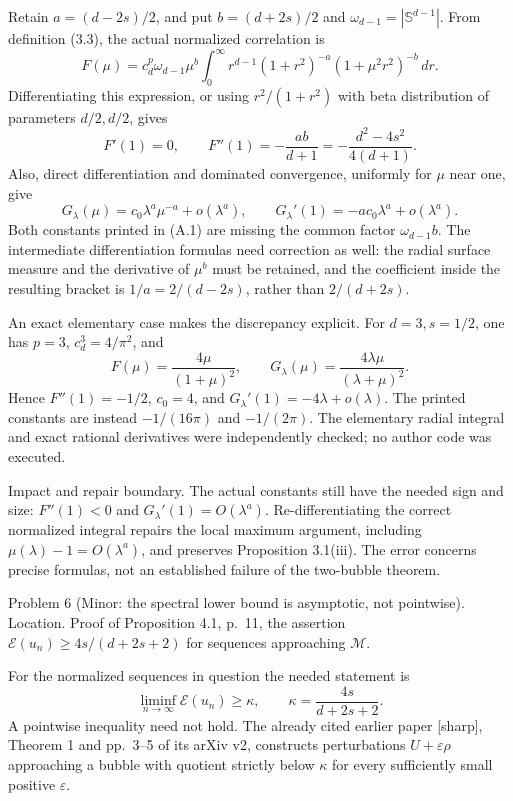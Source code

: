 \documentclass[10pt]{article}
\begin{document}
Retain \(a=(d-2s)/2\), and put \(b=(d+2s)/2\) and \(\omega_{d-1}=|\mathbb S^{d-1}|\). From definition (3.3), the actual normalized correlation is \[F(\mu)=c_d^p\omega_{d-1}\mu^b
 \int_0^\infty r^{d-1}(1+r^2)^{-a}(1+\mu^2r^2)^{-b}\,dr.\] Differentiating this expression, or using \(r^2/(1+r^2)\) with beta distribution of parameters \(d/2,d/2\), gives \[F'(1)=0,\qquad
 F''(1)=-\frac{ab}{d+1}
       =-\frac{d^2-4s^2}{4(d+1)}.\] Also, direct differentiation and dominated convergence, uniformly for \(\mu\) near one, give \[G_\lambda(\mu)=c_0\lambda^a\mu^{-a}+o(\lambda^a),
 \qquad G_\lambda'(1)=-a c_0\lambda^a+o(\lambda^a).\] Both constants printed in (A.1) are missing the common factor \(\omega_{d-1}b\). The intermediate differentiation formulas need correction as well: the radial surface measure and the derivative of \(\mu^b\) must be retained, and the coefficient inside the resulting bracket is \(1/a=2/(d-2s)\), rather than \(2/(d+2s)\).\par
An exact elementary case makes the discrepancy explicit. For \(d=3,s=1/2\), one has \(p=3\), \(c_d^3=4/\pi^2\), and \[F(\mu)=\frac{4\mu}{(1+\mu)^2},\qquad
 G_\lambda(\mu)=\frac{4\lambda\mu}{(\lambda+\mu)^2}.\] Hence \(F''(1)=-1/2\), \(c_0=4\), and \(G_\lambda'(1)=-4\lambda+o(\lambda)\). The printed constants are instead \(-1/(16\pi)\) and \(-1/(2\pi)\). The elementary radial integral and exact rational derivatives were independently checked; no author code was executed.\par
Impact and repair boundary. The actual constants still have the needed sign and size: \(F''(1)<0\) and \(G_\lambda'(1)=O(\lambda^a)\). Re-differentiating the correct normalized integral repairs the local maximum argument, including \(\mu(\lambda)-1=O(\lambda^a)\), and preserves Proposition 3.1(iii). The error concerns precise formulas, not an established failure of the two-bubble theorem.\par
Problem 6 (Minor: the spectral lower bound is asymptotic, not pointwise).  Location. Proof of Proposition 4.1, p. 11, the assertion \(\mathcal E(u_n)\ge4s/(d+2s+2)\) for sequences approaching \(\mathcal M\).\par
For the normalized sequences in question the needed statement is \[\liminf_{n\to\infty}\mathcal E(u_n)\ge\kappa,
 \qquad \kappa=\frac{4s}{d+2s+2}.\] A pointwise inequality need not hold. The already cited earlier paper [sharp], Theorem 1 and pp. 3–5 of its arXiv v2, constructs perturbations \(U+\varepsilon\rho\) approaching a bubble with quotient strictly below \(\kappa\) for every sufficiently small positive \(\varepsilon\).\par
\end{document}
